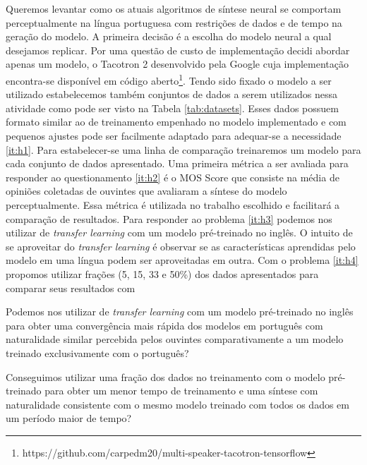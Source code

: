 \documentclass{article}
\begin{document}
Queremos levantar como os atuais algoritmos de síntese neural se comportam perceptualmente na língua portuguesa com restrições de dados e de tempo na geração do modelo. 
A primeira decisão é a escolha do modelo neural a qual desejamos replicar. 
Por uma questão de custo de implementação decidi abordar apenas um modelo, o Tacotron 2 \cite{tacotron2:DBLP:journals/corr/abs-1712-05884} desenvolvido pela Google cuja implementação encontra-se disponível em código aberto\footnote{https://github.com/carpedm20/multi-speaker-tacotron-tensorflow}.
Tendo sido fixado o modelo a ser utilizado estabelecemos também conjuntos de dados a serem utilizados nessa atividade como pode ser visto na Tabela \ref{tab:datasets}.
Esses dados possuem formato similar ao de treinamento empenhado no modelo implementado e com pequenos ajustes pode ser facilmente adaptado para adequar-se a necessidade \ref{it:h1}.
Para estabelecer-se uma linha de comparação treinaremos um modelo para cada conjunto de dados apresentado.
Uma primeira métrica a ser avaliada para responder ao questionamento \ref{it:h2} é o MOS Score que consiste na média de opiniões coletadas de ouvintes que avaliaram a síntese do modelo perceptualmente.
Essa métrica é utilizada no trabalho escolhido e facilitará a comparação de resultados.
Para responder ao problema \ref{it:h3} podemos nos utilizar de \textit{transfer learning} com um modelo pré-treinado no inglês.
O intuito de se aproveitar do \textit{transfer learning} é observar se as características aprendidas pelo modelo em uma língua podem ser aproveitadas em outra.
Com o problema \ref{it:h4} propomos utilizar frações (5, 15, 33 e 50\%) dos dados apresentados para comparar seus resultados com




Podemos nos utilizar de \textit{transfer learning} com um modelo pré-treinado no inglês para obter uma convergência mais rápida dos modelos em português com naturalidade similar percebida pelos ouvintes comparativamente a um modelo treinado exclusivamente com o português?

Conseguimos utilizar uma fração dos dados no treinamento com o modelo pré-treinado para obter um menor tempo de treinamento e uma síntese com naturalidade consistente com o mesmo modelo treinado com todos os dados em um período maior de tempo?
\end{document}
